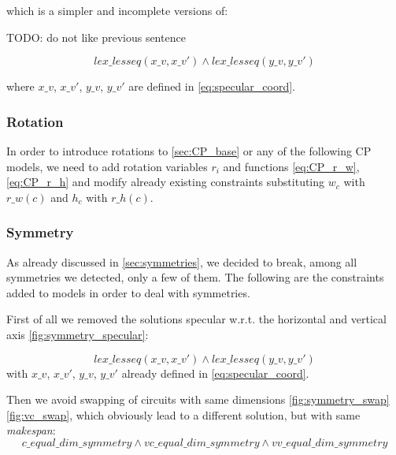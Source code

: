         which is a simpler and incomplete versions of:

        \colorbox{BurntOrange}{TODO: do not like previous sentence}

        \begin{equation*}
            lex\_lesseq(x\_v, x\_v') \land lex\_lesseq(y\_v, y\_v')
        \end{equation*} 

        where $x\_v$, $x\_v'$, $y\_v$, $y\_v'$ are defined in \ref{eq:specular_coord}.


    \subsubsection{Rotation}
        
        In order to introduce rotations to \ref{sec:CP_base} or any of the following CP models, we need 
        to add rotation variables $r_i$ and functions \ref{eq:CP_r_w}, \ref{eq:CP_r_h} and modify 
        already existing constraints substituting $w_c$ with $r\_w(c)$ and $h_c$ with $r\_h(c)$.

    \subsubsection{Symmetry}

        As already discussed in \ref{sec:symmetries}, we decided to break, among all symmetries we 
        detected, only a few of them. The following are the constraints added to models in order to 
        deal with symmetries. 
        
        First of all we removed the solutions specular w.r.t. the horizontal and vertical axis \ref{fig:symmetry_specular}:
        
        \begin{equation*}
            lex\_lesseq(x\_v, x\_v') \land lex\_lesseq(y\_v, y\_v')
        \end{equation*} 
        with $x\_v$, $x\_v'$, $y\_v$, $y\_v'$ already defined in \ref{eq:specular_coord}.

        Then we avoid swapping of circuits with same dimensions \ref{fig:symmetry_swap} \ref{fig:vc_swap}, 
        which obviously lead to a different solution, but with same \textit{makespan}:
        \begin{equation*}
            c\_equal\_dim\_symmetry \land vc\_equal\_dim\_symmetry \land vv\_equal\_dim\_symmetry
        \end{equation*}
        
